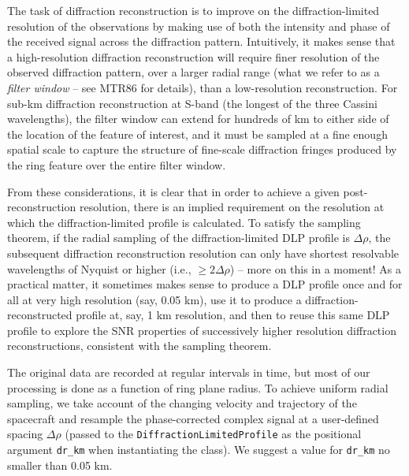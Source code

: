 \documentclass[titlepage, 12pt]{article}
\begin{document}
        \par\hfill\par
        The task of diffraction reconstruction is to improve on the diffraction-limited resolution of the observations by making use of both the intensity and phase of the received signal across the diffraction pattern. Intuitively, it makes sense that a high-resolution diffraction reconstruction will require finer resolution of the observed diffraction pattern, over a larger radial range (what we refer to as a \textit{filter window} -- see MTR86 for details), than a low-resolution reconstruction. For sub-km diffraction reconstruction at S-band (the longest of the three Cassini wavelengths), the filter window can extend for hundreds of km to either side of the location of the feature of interest, and it must be sampled at a fine enough spatial scale to capture the structure of fine-scale diffraction fringes produced by the ring feature over the entire filter window.
          \par\hfill\par
        From these considerations, it is clear that in order to achieve a given post-reconstruction resolution, there is an implied requirement on the resolution at which the diffraction-limited profile is calculated. To satisfy the sampling theorem, if the radial sampling of the diffraction-limited DLP profile is $\Delta\rho$, the subsequent diffraction reconstruction resolution can only 
        have shortest resolvable wavelengths of Nyquist or higher (i.e., 
        $\ge2\Delta\rho$) -- more on this in a moment! As a practical matter, it sometimes makes sense to produce a DLP profile once and for all at very high resolution (say, 0.05 km), use it to produce a diffraction-reconstructed profile at, say, 1 km resolution, and then to reuse this same DLP profile to explore the SNR properties of successively higher resolution diffraction reconstructions, consistent with the sampling theorem.
        \par\hfill\par
        The original data are recorded at regular intervals in time, but most of our processing is done as a function of ring plane radius.
        To achieve uniform radial sampling, we take account of the changing velocity and trajectory of the spacecraft and resample the phase-corrected complex
        signal at a user-defined spacing $\Delta\rho$ (passed to the 
        \texttt{DiffractionLimitedProfile} as the positional argument \texttt{dr\_km}
        when instantiating the class). We 
        suggest a value for \texttt{dr\_km} no smaller than 0.05 km.
\end{document}
